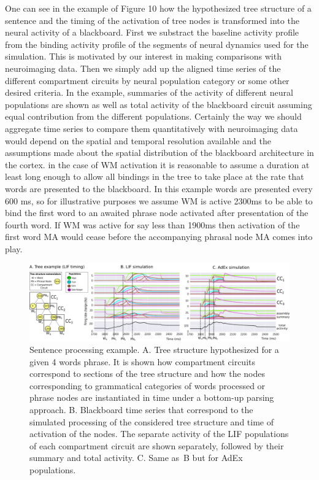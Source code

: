 \documentclass[10pt]{article}
\begin{document}
One can see in the example of Figure 10 how the hypothesized tree structure of a sentence and the timing of the activation of tree nodes is transformed into the neural activity of a blackboard.
First we substract the baseline activity profile from the binding activity profile of the segments of neural dynamics used for the simulation.
This is motivated by our interest in making comparisons with neuroimaging data.
Then we simply add up the aligned time series of the different compartment circuits by neural population category or some other desired criteria.
In the example, summaries of the activity of different neural populations are shown as well as total activity of the blackboard circuit assuming equal contribution from the different populations.
Certainly the way we should aggregate time series to compare them quantitatively with neuroimaging data would depend on the spatial and temporal resolution available and the assumptions made about the spatial distribution of the blackboard architecture in the cortex.
in the case of WM activation it is reasonable to assume a duration at least long enough to allow all bindings in the tree to take place at the rate that words are presented to the blackboard.
In this example words are presented every 600 ms, so for illustrative purposes we assume WM is active 2300ms to be able to bind the first word to an awaited phrase node activated after presentation of the fourth word.
If WM was active for say less than 1900ms then activation of the first word MA would cease before the accompanying phrasal node MA comes into play.

\begin{figure}[h!]
  \begin{center}
    \includegraphics[width=1.00\columnwidth]{figures/compartments_tree_example/compartments_tree_example}
    \caption{Sentence processing example.
      A. Tree structure hypothesized for a given 4 words phrase.
      It is shown how compartment circuits correspond to sections of the tree structure and how the nodes corresponding to grammatical categories of words processed or phrase nodes are instantiated in time under a bottom-up parsing approach.
      B. Blackboard time series that correspond to the simulated processing of the considered tree structure and time of activation of the nodes.
      The separate activity of the LIF populations of each compartment circuit are shown separately, followed by their summary and total activity.
      C. Same as~B but for AdEx populations. {\label{679921}}%
    }
  \end{center}
\end{figure}
\end{document}
